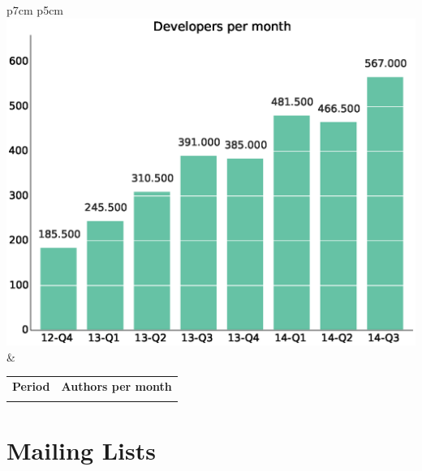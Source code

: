 \documentclass[a4wide,11pt]{report}
\begin{document}
\begin{tabular}{p{7cm} p{5cm}}
    \vspace{0pt} 
    \includegraphics[scale=.35]{figs/authors_month.eps}
    & 
    \vspace{0pt}
    \begin{tabular}{l|r|}%
    \bfseries Period & \bfseries Authors per month%
   \csvreader[head to column names]{data/authors_month.csv}{}%
   {\\ & \authormonth}
   \end{tabular}
\end{tabular}

\section{Mailing Lists}
\end{document}
